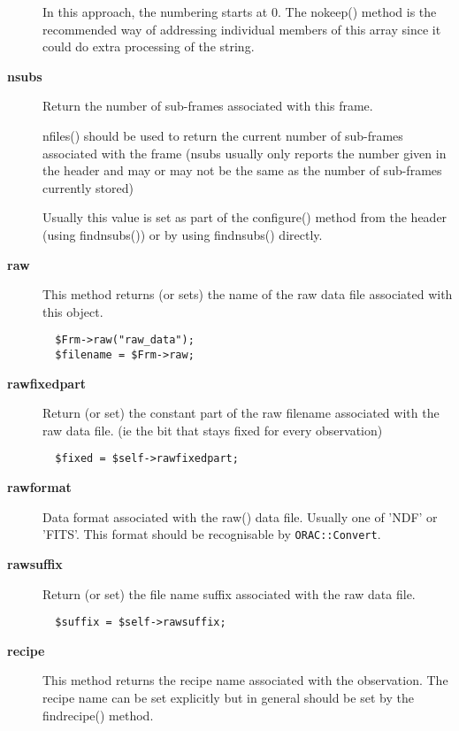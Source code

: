 \begin{description}
In this approach, the numbering starts at 0. The nokeep() method
is the recommended way of addressing individual members of this
array since it could do extra processing of the
string.

\item[\textbf{nsubs}] \mbox{}

Return the number of sub-frames associated with this frame.



nfiles() should be used to return the current number of sub-frames
associated with the frame (nsubs usually only reports the number given
in the header and may or may not be the same as the number of sub-frames
currently stored)



Usually this value is set as part of the configure() method from
the header (using findnsubs()) or by using findnsubs() directly.

\item[\textbf{raw}] \mbox{}

This method returns (or sets) the name of the raw data file
associated with this object.

\begin{verbatim}
  $Frm->raw("raw_data");
  $filename = $Frm->raw;
\end{verbatim}
\item[\textbf{rawfixedpart}] \mbox{}

Return (or set) the constant part of the raw filename associated
with the raw data file. (ie the bit that stays fixed for every 
observation)

\begin{verbatim}
  $fixed = $self->rawfixedpart;
\end{verbatim}
\item[\textbf{rawformat}] \mbox{}

Data format associated with the raw() data file.
Usually one of 'NDF' or 'FITS'. This format should be
recognisable by \texttt{ORAC::Convert}.

\item[\textbf{rawsuffix}] \mbox{}

Return (or set) the file name suffix associated with
the raw data file.

\begin{verbatim}
  $suffix = $self->rawsuffix;
\end{verbatim}
\item[\textbf{recipe}] \mbox{}

This method returns the recipe name associated with the observation.
The recipe name can be set explicitly but in general should be
set by the findrecipe() method.


\end{description}
